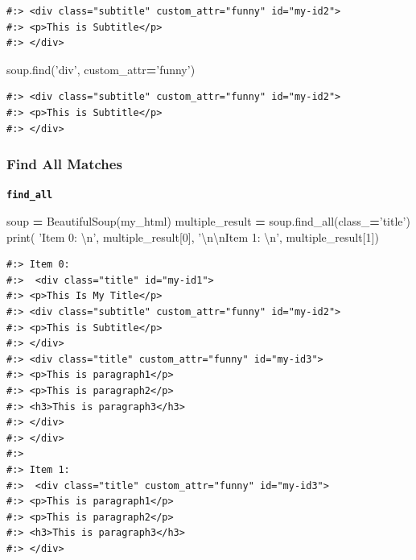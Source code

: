 \documentclass[
]{book}
\newenvironment{Shaded}{\begin{snugshade}}{\end{snugshade}}
\newcommand{\BuiltInTok}[1]{#1}
\newcommand{\CharTok}[1]{\textcolor[rgb]{0.5,0.5,0.5}{#1}}
\newcommand{\DecValTok}[1]{\textcolor[rgb]{0.06,0.06,0.06}{#1}}
\newcommand{\NormalTok}[1]{#1}
\newcommand{\OperatorTok}[1]{\textcolor[rgb]{0.43,0.43,0.43}{\textbf{#1}}}
\newcommand{\StringTok}[1]{\textcolor[rgb]{0.5,0.5,0.5}{#1}}
\begin{document}
\begin{verbatim}
#:> <div class="subtitle" custom_attr="funny" id="my-id2">
#:> <p>This is Subtitle</p>
#:> </div>
\end{verbatim}

\begin{Shaded}
\begin{Highlighting}[]
\NormalTok{soup.find(}\StringTok{'div'}\NormalTok{, custom_attr}\OperatorTok{=}\StringTok{'funny'}\NormalTok{)}
\end{Highlighting}
\end{Shaded}

\begin{verbatim}
#:> <div class="subtitle" custom_attr="funny" id="my-id2">
#:> <p>This is Subtitle</p>
#:> </div>
\end{verbatim}

\hypertarget{find-all-matches-1}{%
\subsubsection{Find All Matches}\label{find-all-matches-1}}

\textbf{\texttt{find\_all}}

\begin{Shaded}
\begin{Highlighting}[]
\NormalTok{soup }\OperatorTok{=}\NormalTok{ BeautifulSoup(my_html)}
\NormalTok{multiple_result }\OperatorTok{=}\NormalTok{ soup.find_all(class_}\OperatorTok{=}\StringTok{'title'}\NormalTok{)}
\BuiltInTok{print}\NormalTok{( }\StringTok{'Item 0: }\CharTok{\textbackslash{}n}\StringTok{'}\NormalTok{,     multiple_result[}\DecValTok{0}\NormalTok{],}
       \StringTok{'}\CharTok{\textbackslash{}n\textbackslash{}n}\StringTok{Item 1: }\CharTok{\textbackslash{}n}\StringTok{'}\NormalTok{, multiple_result[}\DecValTok{1}\NormalTok{])}
\end{Highlighting}
\end{Shaded}

\begin{verbatim}
#:> Item 0: 
#:>  <div class="title" id="my-id1">
#:> <p>This Is My Title</p>
#:> <div class="subtitle" custom_attr="funny" id="my-id2">
#:> <p>This is Subtitle</p>
#:> </div>
#:> <div class="title" custom_attr="funny" id="my-id3">
#:> <p>This is paragraph1</p>
#:> <p>This is paragraph2</p>
#:> <h3>This is paragraph3</h3>
#:> </div>
#:> </div> 
#:> 
#:> Item 1: 
#:>  <div class="title" custom_attr="funny" id="my-id3">
#:> <p>This is paragraph1</p>
#:> <p>This is paragraph2</p>
#:> <h3>This is paragraph3</h3>
#:> </div>
\end{verbatim}
\end{document}
